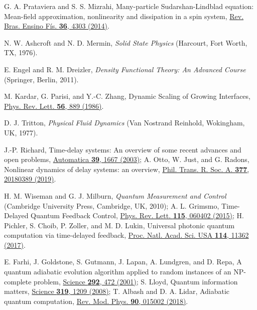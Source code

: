 \documentclass[aps,pra,twocolumn,floatfix,groupedaddress,superscriptaddress,nofootinbib,notitlepage]{revtex4-2}
\begin{document}
\begin{thebibliography}{100}
 G. A. Prataviera and S. S. Mizrahi, Many-particle Sudarshan-Lindblad equation: Mean-field approximation, nonlinearity and dissipation in a spin system, \href{https://doi.org/10.1590/S1806-11172014000400004}{Rev. Bras. Ensino F\'{i}s. \textbf{36}, 4303 (2014)}.

 N. W. Ashcroft and N. D. Mermin, \emph{Solid State Physics} (Harcourt, Fort Worth, TX, 1976).

 E. Engel and R. M. Dreizler, \emph{Density Functional Theory: An Advanced Course} (Springer, Berlin, 2011).

 M. Kardar, G. Parisi, and Y.-C. Zhang, Dynamic Scaling of Growing Interfaces, \href{https://doi.org/10.1103/PhysRevLett.56.889}{Phys. Rev. Lett. \textbf{56}, 889 (1986)}.

 D. J. Tritton, \emph{Physical Fluid Dynamics} (Van Nostrand Reinhold, Wokingham, UK, 1977).
 
 J.-P. Richard, Time-delay systems: An overview of some recent advances and open problems, \href{https://doi.org/10.1016/S0005-1098(03)00167-5}{Automatica \textbf{39}, 1667 (2003)}; A. Otto, W. Just, and G. Radons, Nonlinear dynamics of delay systems: an overview, \href{https://doi.org/10.1098/rsta.2018.0389}{Phil. Trans. R. Soc. A. \textbf{377}, 20180389 (2019)}.

 H. M. Wiseman and G. J. Milburn, \emph{Quantum Measurement and Control} (Cambridge University Press, Cambridge, UK, 2010); A. L. Grimsmo, Time-Delayed Quantum Feedback Control, \href{https://doi.org/10.1103/PhysRevLett.115.060402}{Phys. Rev. Lett. \textbf{115}, 060402 (2015)}; H. Pichler, S. Choib, P. Zoller, and M. D. Lukin, Universal photonic quantum computation via time-delayed feedback, \href{https://doi.org/10.1073/pnas.1711003114}{Proc. Natl. Acad. Sci. USA \textbf{114}, 11362 (2017)}.

 E. Farhi, J. Goldstone, S. Gutmann, J. Lapan, A. Lundgren, and D. Repa, A quantum adiabatic evolution algorithm applied to random instances of an NP-complete problem, \href{https://doi.org/10.1126/science.1057726}{Science \textbf{292}, 472 (2001)}; S. Lloyd, Quantum information matters, \href{https://doi.org/10.1126/science.1154732}{Science \textbf{319}, 1209 (2008)}; T. Albash and D. A. Lidar, Adiabatic quantum computation, \href{https://doi.org/10.1103/RevModPhys.90.015002}{Rev. Mod. Phys. \textbf{90}, 015002 (2018)}.


\end{thebibliography}
\end{document}
